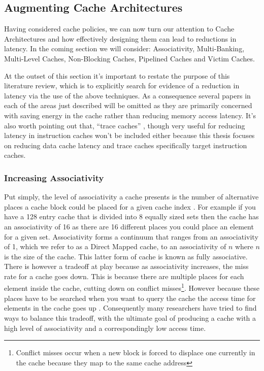 \subsection{Augmenting Cache Architectures}
Having considered cache policies, we can now turn our attention to Cache Architectures and how effectively designing them can lead to reductions in latency. In the coming section we will consider: Associativity, Multi-Banking, Multi-Level Caches, Non-Blocking Caches, Pipelined Caches and Victim Caches. 

At the outset of this section it's important to restate the purpose of this literature review, which is to explicitly search for evidence of a reduction in latency via the use of the above techniques. As a consequence several papers in each of the areas just described will be omitted as they are primarily concerned with saving energy in the cache rather than reducing memory access latency. It's also worth pointing out that, ``trace caches''\cite{rotenbergTraceCacheMicroarchitecture1999, ramirezTraceCacheRedundancy2000} , though very useful for reducing latency in instruction caches won't be included either because this thesis focuses on reducing data cache latency and trace caches specifically target instruction caches.

\subsubsection{Increasing Associativity}

Put simply, the level of associativity a cache presents is the number of alternative places a cache block could be placed for a given cache index \cite{pachecoParallelHardwareParallel2011}. For example if you have a 128 entry cache that is divided into 8 equally sized sets then the cache has an associativity of 16 as there are 16 different places you could place an element for a given set. Associativity forms a continuum that ranges from an associativity of 1, which we refer to as a Direct Mapped cache, to an associativity of $n$ where $n$ is the size of the cache. This latter form of cache is known as fully associative. There is however a tradeoff at play because as associativity increases, the miss rate for a cache goes down. This is because there are multiple places for each element inside the cache, cutting down on conflict misses\footnote{Conflict misses occur when a new block is forced to displace one currently in the cache because they map to the same cache address}. However because these places have to be searched when you want to query the cache the access time for elements in the cache goes up \cite{kesslerInexpensiveImplementationsSetAssociativity1989}. Consequently many researchers have tried to find ways to balance this tradeoff, with the ultimate goal of producing a cache with a high level of associativity and a correspondingly low access time. 

